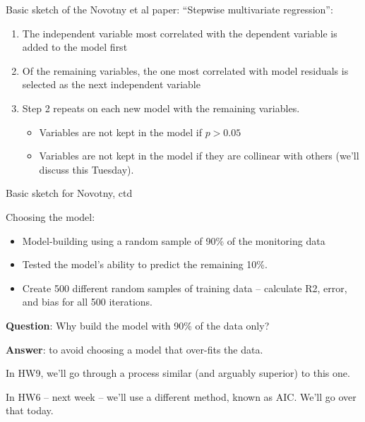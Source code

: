 \documentclass[aspectratio=169]{beamer}
\begin{document}
\begin{frame}{Basic sketch of the Novotny et al paper:}
``Stepwise multivariate regression'':
\begin{enumerate}
\item The independent variable most correlated with the dependent variable is added to the model first
\item Of the remaining variables, the one most correlated with model residuals is selected as the next independent variable
\item Step 2 repeats on each new model with the remaining variables.  
\begin{itemize}
\item Variables are not kept in the model if $p>0.05$
\item Variables are not kept in the model if they are collinear with others (we'll discuss this Tuesday).
\end{itemize}
\end{enumerate}
\end{frame}


\begin{frame}{Basic sketch for Novotny, ctd}

Choosing the model:
\begin{itemize}
\item Model-building using a random sample of 90\% of the monitoring data 
\item Tested the model's ability to predict the remaining 10\%. 
\item Create 500 different random samples of training data -- calculate R2, error, and bias for all 500 iterations. 
\end{itemize}

\textbf{Question}: Why build the model with 90\% of the data only?\pause

\vspace{5mm}
\textbf{Answer}: to avoid choosing a model that over-fits the data.

\vspace{5mm}
In HW9, we'll go through a process similar (and arguably superior) to this one.

\vspace{5mm}
In HW6 -- next week -- we'll use a different method, known as AIC.  We'll go over that today.  
\end{frame}
	
\end{document}
